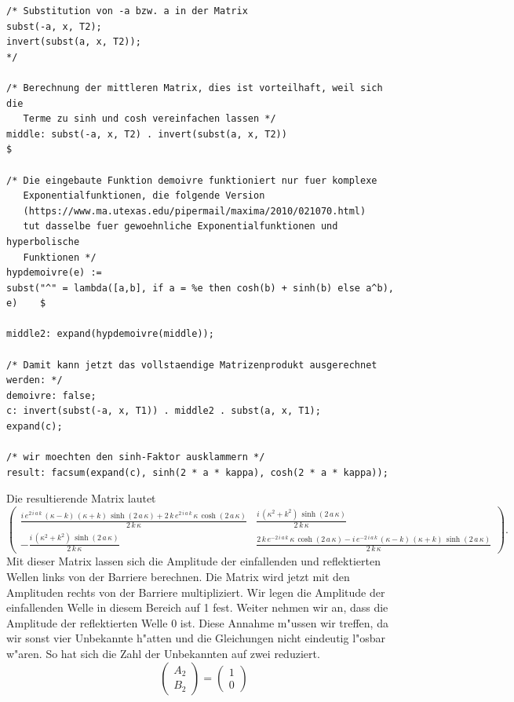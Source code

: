 \begin{refsection}
\begin{lstlisting}[style=Maxima]
/* Substitution von -a bzw. a in der Matrix
subst(-a, x, T2);
invert(subst(a, x, T2));
*/

/* Berechnung der mittleren Matrix, dies ist vorteilhaft, weil sich die
   Terme zu sinh und cosh vereinfachen lassen */
middle: subst(-a, x, T2) . invert(subst(a, x, T2))                          $

/* Die eingebaute Funktion demoivre funktioniert nur fuer komplexe
   Exponentialfunktionen, die folgende Version
   (https://www.ma.utexas.edu/pipermail/maxima/2010/021070.html)
   tut dasselbe fuer gewoehnliche Exponentialfunktionen und hyperbolische
   Funktionen */
hypdemoivre(e) :=
subst("^" = lambda([a,b], if a = %e then cosh(b) + sinh(b) else a^b), e)    $

middle2: expand(hypdemoivre(middle));

/* Damit kann jetzt das vollstaendige Matrizenprodukt ausgerechnet werden: */
demoivre: false;
c: invert(subst(-a, x, T1)) . middle2 . subst(a, x, T1);
expand(c);

/* wir moechten den sinh-Faktor ausklammern */
result: facsum(expand(c), sinh(2 * a * kappa), cosh(2 * a * kappa));

\end{lstlisting}


Die resultierende Matrix lautet
\[
\begin{pmatrix}
\frac{i\,e^{2\,i\,a\,k}\,\left(\kappa-k\right)\,\left(\kappa+k
 \right)\,\sinh \left(2\,a\,\kappa\right)+2\,k\,e^{2\,i\,a\,k}\,
 \kappa\,\cosh \left(2\,a\,\kappa\right)}{2\,k\,\kappa}
&
\frac{i\,
 \left(\kappa^2+k^2\right)\,\sinh \left(2\,a\,\kappa\right)}{2\,
 k\,\kappa}
\\
-\frac{i\,\left(\kappa^2+k^2\right)\,\sinh \left(2\,a\,
 \kappa\right)}{2\,k\,\kappa}
&
\frac{2\,k\,e^ {- 2\,i\,a\,k }\,
 \kappa\,\cosh \left(2\,a\,\kappa\right)-i\,e^ {- 2\,i\,a\,k }\,
 \left(\kappa-k\right)\,\left(\kappa+k\right)\,\sinh \left(2\,a\,
 \kappa\right)}{2\,k\,\kappa}
\end{pmatrix}.
\]
Mit dieser Matrix lassen sich die Amplitude der einfallenden und reflektierten Wellen links von der Barriere berechnen.
Die Matrix wird jetzt mit den Amplituden rechts von der Barriere multipliziert. 
Wir legen die Amplitude der einfallenden Welle in diesem Bereich auf 1 fest. 
Weiter nehmen wir an, dass die Amplitude der reflektierten Welle 0 ist.
Diese Annahme m"ussen wir treffen, da wir sonst vier Unbekannte h"atten und die Gleichungen nicht eindeutig l"osbar w"aren.
So hat sich die Zahl der Unbekannten auf zwei reduziert.
\[
\begin{pmatrix}
A_2
\\
B_2
\end{pmatrix}
=
\begin{pmatrix}
1
\\
0
\end{pmatrix}
\]


\end{refsection}
